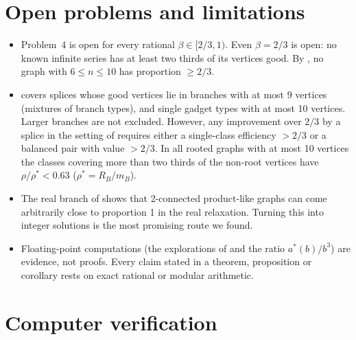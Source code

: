 \documentclass[11pt,a4paper]{report}
\begin{document}
\section{Open problems and limitations}\label{sec:open}

\begin{itemize}
\item Problem~4 is open for every rational \(\beta\in[2/3,1)\). Even \(\beta=2/3\) is open: no known infinite series
has at least two thirds of its vertices good. By , no graph with \(6\le n\le10\) has proportion
\(\ge2/3\).
\item {} covers splices whose good vertices lie in branches with at most 9 vertices (mixtures of
branch types), and single gadget types with at most 10 vertices. Larger branches are not excluded. However, any
improvement over \(2/3\) by a splice in the setting of  requires either a single-class efficiency
\(>2/3\) or a balanced pair with value \(>2/3\). In all rooted graphs
with at most 10 vertices the classes covering more than two thirds of the non-root vertices have \(\rho/\rho^*<0.63\)
(\(\rho^*=R_B/m_B\)).
\item The real branch of  shows that 2-connected product-like graphs can come arbitrarily close to
proportion 1 in the real relaxation. Turning this into integer solutions is the most promising route we found.
\item Floating-point computations (the explorations of  and the ratio \(a^*(b)/b^3\)) are evidence,
not proofs. Every claim stated in a theorem, proposition or corollary rests on exact rational or modular
arithmetic.
\end{itemize}

\section{Computer verification}\label{sec:verif}
\end{document}
